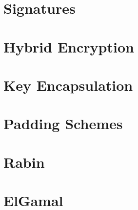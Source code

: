\section{Signatures}

\section{Hybrid Encryption}

\section{Key Encapsulation}

\section{Padding Schemes}

\section{Rabin}

\section{ElGamal}